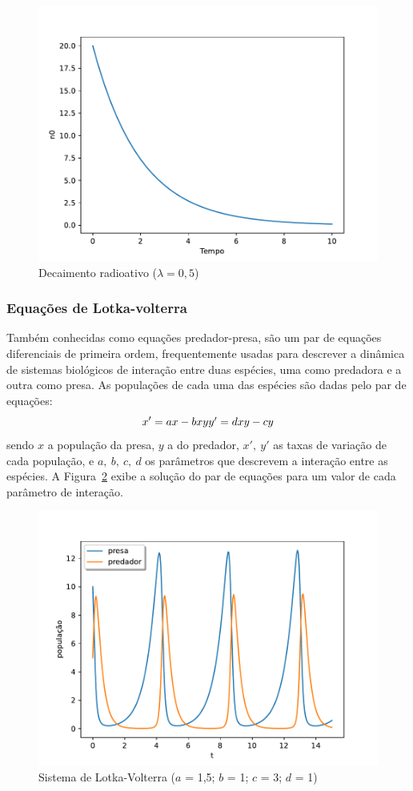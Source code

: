 \begin{figure}[tb]
	\centering
	\caption{Decaimento radioativo ($\lambda = 0,5$)}
	\label{fig:decaimento}
	\includegraphics[width=0.6\linewidth]{figs/decaimento}
\end{figure}

\subsubsection{Equações de Lotka-volterra}
Também conhecidas como equações predador-presa, são um par de equações diferenciais de primeira ordem, frequentemente usadas para descrever a dinâmica de sistemas biológicos de interação entre duas espécies, uma como predadora e a outra como presa. As populações de cada uma das espécies são dadas pelo par de equações:
\begin{equation}\label{eq:lotka_volterra}
	x' = ax - bxy
	$$$$
	y' = dxy - cy
\end{equation}
sendo $x$ a população da presa, $y$ a do predador, $x',\ y'$ as taxas de variação de cada população, e $a,\ b,\ c,\ d$ os parâmetros que descrevem a interação entre as espécies. A Figura~\ref{fig:lotka-volterra} exibe a solução do par de equações para um valor de cada parâmetro de interação.

\begin{figure}[tb]
	\centering
	\caption{Sistema de Lotka-Volterra ($a$ = 1,5; $b$ = 1; $c$ = 3; $d$ = 1)}
	\label{fig:lotka-volterra}
	\includegraphics[width=0.6\linewidth]{figs/lotka-volterra}
\end{figure}

